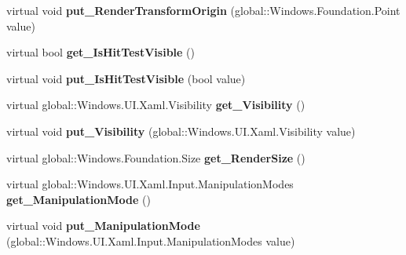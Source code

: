 \begin{DoxyCompactItemize}
virtual void {\bfseries put\+\_\+\+Render\+Transform\+Origin} (global\+::\+Windows.\+Foundation.\+Point value)
\item 
\mbox{\label{class_windows_1_1_u_i_1_1_xaml_1_1_u_i_element_acafd318a1c0b56bfb701aec3a210bec1}} 
virtual bool {\bfseries get\+\_\+\+Is\+Hit\+Test\+Visible} ()
\item 
\mbox{\label{class_windows_1_1_u_i_1_1_xaml_1_1_u_i_element_a91c0826f6d39080d6e6c6bca0144cdb1}} 
virtual void {\bfseries put\+\_\+\+Is\+Hit\+Test\+Visible} (bool value)
\item 
\mbox{\label{class_windows_1_1_u_i_1_1_xaml_1_1_u_i_element_a28fb7dc5ba5e68bbf934a134e97777f2}} 
virtual global\+::\+Windows.\+U\+I.\+Xaml.\+Visibility {\bfseries get\+\_\+\+Visibility} ()
\item 
\mbox{\label{class_windows_1_1_u_i_1_1_xaml_1_1_u_i_element_aa21b9a45ef782cd5fe687bf2ad1b542a}} 
virtual void {\bfseries put\+\_\+\+Visibility} (global\+::\+Windows.\+U\+I.\+Xaml.\+Visibility value)
\item 
\mbox{\label{class_windows_1_1_u_i_1_1_xaml_1_1_u_i_element_ae8754f086fb49dc408bd75c4277a1aaa}} 
virtual global\+::\+Windows.\+Foundation.\+Size {\bfseries get\+\_\+\+Render\+Size} ()
\item 
\mbox{\label{class_windows_1_1_u_i_1_1_xaml_1_1_u_i_element_a144176607f6318a776be9a5bd0836be5}} 
virtual global\+::\+Windows.\+U\+I.\+Xaml.\+Input.\+Manipulation\+Modes {\bfseries get\+\_\+\+Manipulation\+Mode} ()
\item 
\mbox{\label{class_windows_1_1_u_i_1_1_xaml_1_1_u_i_element_a2d57a47a49d348fcb616d78e70fbb023}} 
virtual void {\bfseries put\+\_\+\+Manipulation\+Mode} (global\+::\+Windows.\+U\+I.\+Xaml.\+Input.\+Manipulation\+Modes value)
\item 
\mbox{\label{class_windows_1_1_u_i_1_1_xaml_1_1_u_i_element_ae3fbd9d6083ca5ff6d54b03c98f3ddd0}} 

\end{DoxyCompactItemize}
